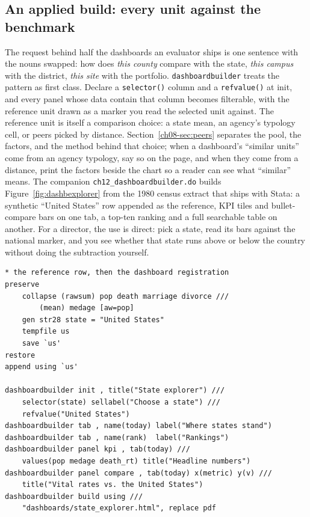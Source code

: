 \subsection{An applied build: every unit against the benchmark}
The request behind half the dashboards an evaluator ships is one sentence with the nouns swapped: how does \emph{this county} compare with the state, \emph{this campus} with the district, \emph{this site} with the portfolio. \texttt{dashboardbuilder} treats the pattern as first class. Declare a \texttt{selector()} column and a \texttt{refvalue()} at init, and every panel whose data contain that column becomes filterable, with the reference unit drawn as a marker you read the selected unit against. The reference unit is itself a comparison choice: a state mean, an agency's typology cell, or peers picked by distance. Section~\ref{ch08-sec:peers} separates the pool, the factors, and the method behind that choice; when a dashboard's \enquote{similar units} come from an agency typology, say so on the page, and when they come from a distance, print the factors beside the chart so a reader can see what \enquote{similar} means. The companion \texttt{ch12\_dashboardbuilder.do} builds Figure~\ref{fig:dashbexplorer} from the 1980 census extract that ships with Stata: a synthetic \enquote{United States} row appended as the reference, KPI tiles and bullet-compare bars on one tab, a top-ten ranking and a full searchable table on another. For a director, the use is direct: pick a state, read its bars against the national marker, and you see whether that state runs above or below the country without doing the subtraction yourself.
\par
{\footnotesize
\begin{verbatim}
* the reference row, then the dashboard registration
preserve
    collapse (rawsum) pop death marriage divorce ///
        (mean) medage [aw=pop]
    gen str28 state = "United States"
    tempfile us
    save `us'
restore
append using `us'

dashboardbuilder init , title("State explorer") ///
    selector(state) sellabel("Choose a state") ///
    refvalue("United States")
dashboardbuilder tab , name(today) label("Where states stand")
dashboardbuilder tab , name(rank)  label("Rankings")
dashboardbuilder panel kpi , tab(today) ///
    values(pop medage death_rt) title("Headline numbers")
dashboardbuilder panel compare , tab(today) x(metric) y(v) ///
    title("Vital rates vs. the United States")
dashboardbuilder build using ///
    "dashboards/state_explorer.html", replace pdf
\end{verbatim}
}

